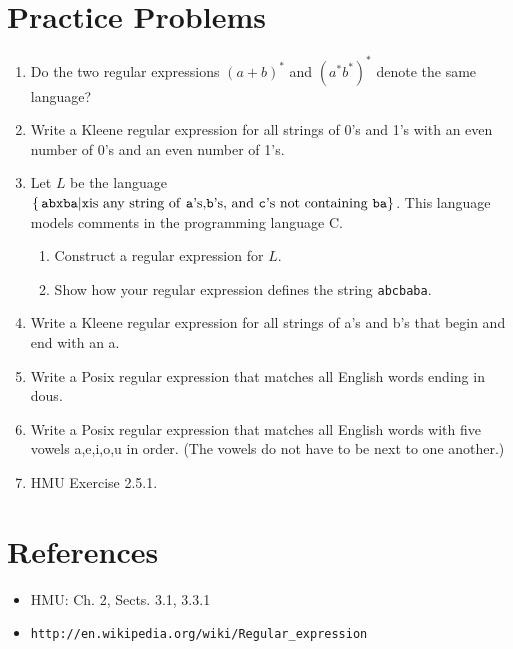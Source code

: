 \documentclass[]{article}
\begin{document}
\section{Practice Problems}
  \begin{enumerate}
    \item Do the two regular expressions $(a + b)^*$ and $(a^*b^*)^*$ denote the
    same language?
    \item Write a Kleene regular expression for all strings of 0's and 1's with
    an even number of 0's and an even number of 1's.
    \item Let $L$ be the language $\{ \, \texttt{abxba} | \texttt{x} \text{is
    any string of \texttt{a}'s,\texttt{b}'s, and \texttt{c}'s not containing
    \texttt{ba}} \}$. This language models comments in the programming language
    C.
      \begin{enumerate}
        \item Construct a regular expression for $L$.
        \item Show how your regular expression defines the string
              \texttt{abcbaba}.
      \end{enumerate}
    \item Write a Kleene regular expression for all strings of a's and b's that
    begin and end with an a.
    \item Write a Posix regular expression that matches all English words ending
    in dous.
    \item Write a Posix regular expression that matches all English words with
    five vowels a,e,i,o,u in order. (The vowels do not have to be next to one
    another.)
    \item HMU Exercise 2.5.1.
  \end{enumerate}

\section{References}
  \begin{itemize}
    \item HMU: Ch. 2, Sects. 3.1, 3.3.1
    \item \verb|http://en.wikipedia.org/wiki/Regular_expression|
  \end{itemize}
\end{document}
